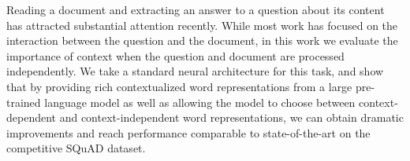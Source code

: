 Reading a document and extracting an answer to a question about its content has attracted substantial attention recently. While most work has focused on the interaction between the question and the document, in this work we evaluate the importance of context when the question and document are processed independently. We take a standard neural architecture for this task, and show that by providing rich contextualized word representations from a large pre-trained language model as well as allowing the model to choose between context-dependent and context-independent word representations, we can obtain dramatic improvements and reach performance comparable to state-of-the-art on the competitive SQuAD dataset.
